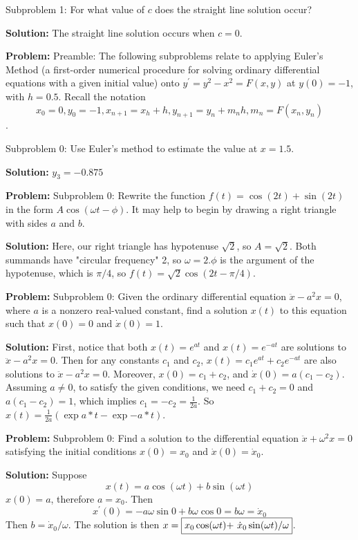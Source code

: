 \documentclass[10pt]{article}
\begin{document}
Subproblem 1: For what value of $c$ does the straight line solution occur?


\textbf{Solution:}
The straight line solution occurs when $c=\boxed{0}$.


\textbf{Problem:}
Preamble: The following subproblems relate to applying Euler's Method (a first-order numerical procedure for solving ordinary differential equations with a given initial value) onto $y^{\prime}=y^{2}-x^{2}=F(x, y)$ at $y(0)=-1$, with $h=0.5$. Recall the notation \[x_{0}=0, y_{0}=-1, x_{n+1}=x_{h}+h, y_{n+1}=y_{n}+m_{n} h, m_{n}=F\left(x_{n}, y_{n}\right)\]. 

Subproblem 0: Use Euler's method to estimate the value at $x=1.5$.


\textbf{Solution:}
$y_3 = \boxed{-0.875}$


\textbf{Problem:}
Subproblem 0: Rewrite the function $f(t) = \cos (2 t)+\sin (2 t)$ in the form $A \cos (\omega t-\phi)$. It may help to begin by drawing a right triangle with sides $a$ and $b$. 


\textbf{Solution:}
Here, our right triangle has hypotenuse $\sqrt{2}$, so $A=\sqrt{2}$. Both summands have "circular frequency" 2, so $\omega=2 . \phi$ is the argument of the hypotenuse, which is $\pi / 4$, so $f(t)=\boxed{\sqrt{2} \cos (2 t-\pi / 4)}$.


\textbf{Problem:}
Subproblem 0: Given the ordinary differential equation $\ddot{x}-a^{2} x=0$, where $a$ is a nonzero real-valued constant, find a solution $x(t)$ to this equation such that $x(0) = 0$ and $\dot{x}(0)=1$.


\textbf{Solution:}
First, notice that both $x(t)=e^{a t}$ and $x(t)=e^{-a t}$ are solutions to $\ddot{x}-a^{2} x=0$. Then for any constants $c_{1}$ and $c_{2}$, $x(t)=c_{1} e^{a t}+c_{2} e^{-a t}$ are also solutions to $\ddot{x}-a^{2} x=0$. Moreover, $x(0)=c_{1}+c_{2}$, and $\dot{x}(0)=a\left(c_{1}-c_{2}\right)$. Assuming $a \neq 0$, to satisfy the given conditions, we need $c_{1}+c_{2}=0$ and $a\left(c_{1}-c_{2}\right)=1$, which implies $c_{1}=-c_{2}=\frac{1}{2 a}$. So $x(t)=\boxed{\frac{1}{2a}(\exp{a*t} - \exp{-a*t})}$.


\textbf{Problem:}
Subproblem 0: Find a solution to the differential equation $\ddot{x}+\omega^{2} x=0$ satisfying the initial conditions $x(0)=x_{0}$ and $\dot{x}(0)=\dot{x}_{0}$.


\textbf{Solution:}
Suppose \[x(t)=a \cos (\omega t)+b \sin (\omega t)\] $x(0)=a$, therefore $a=x_{0}$. Then \[x^{\prime}(0)=-a \omega \sin 0+b \omega \cos 0=b \omega=\dot{x}_{0}\] Then $b=\dot{x}_{0} / \omega$. The solution is then $x=\boxed{x_{0} \cos (\omega t)+$ $\dot{x}_{0} \sin (\omega t) / \omega}$. 
\end{document}
